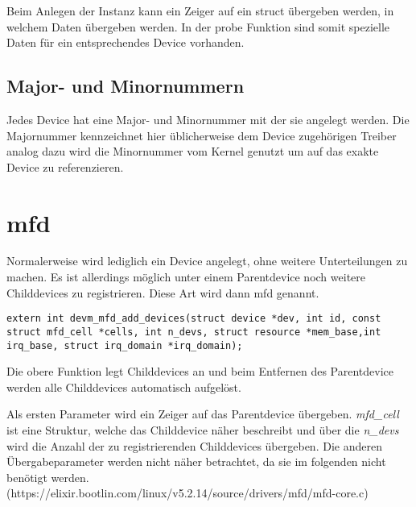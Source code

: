 Beim Anlegen der Instanz kann ein Zeiger auf ein struct übergeben werden, in welchem Daten übergeben werden. In der probe Funktion sind somit spezielle Daten für ein entsprechendes Device vorhanden. \cite{corbetplatform} 


\subsection{Major- und Minornummern}\label{sec:mmnum_t}
Jedes Device hat eine Major- und Minornummer mit der sie angelegt werden.
Die Majornummer kennzeichnet hier üblicherweise dem Device zugehörigen Treiber analog dazu wird die Minornummer vom Kernel genutzt um auf das exakte Device zu referenzieren. \citep[S. 43f]{corbet2005linux} 


\section{\acl{mfd}}\label{sec:mfd_t}
Normalerweise wird lediglich ein Device angelegt, ohne weitere Unterteilungen zu machen. Es ist allerdings möglich unter einem Parentdevice noch weitere Childdevices zu registrieren. Diese Art wird dann \acf{mfd} genannt.

\begin{lstlisting}
extern int devm_mfd_add_devices(struct device *dev, int id, const struct mfd_cell *cells, int n_devs, struct resource *mem_base,int irq_base, struct irq_domain *irq_domain);
\end{lstlisting}

Die obere Funktion legt Childdevices an und beim Entfernen des Parentdevice werden alle Childdevices automatisch aufgelöst.

Als ersten Parameter wird ein Zeiger auf das Parentdevice übergeben. \textit{mfd\_cell} ist eine Struktur, welche das Childdevice näher beschreibt und über die \textit{n\_devs} wird die Anzahl der zu registrierenden Childdevices übergeben. Die anderen Übergabeparameter werden nicht näher betrachtet, da sie im folgenden nicht benötigt werden. 
(https://elixir.bootlin.com/linux/v5.2.14/source/drivers/mfd/mfd-core.c)




